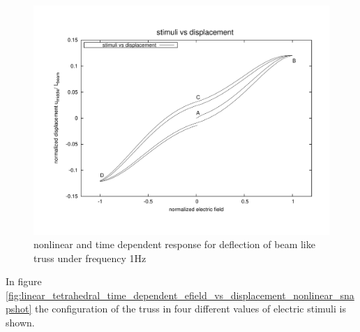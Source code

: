 \begin{figure}   
\centering
\includegraphics[width=5.0in]{./chap_5_active_trusses/images_non_linear_time_dependent_constitutive_equatio/linear_tetrahedral_time_dependent_efield_vs_displacement_nonlinear.pdf}
\caption{nonlinear and time dependent response for deflection of beam like truss under frequency 1Hz}
\label{fig:linear_tetrahedral_time_dependent_efield_vs_displacement_nonlinear}
\end{figure} 

In figure \ref{fig:linear_tetrahedral_time_dependent_efield_vs_displacement_nonlinear_snapshot} the configuration of the truss in four different values of electric stimuli is shown.


